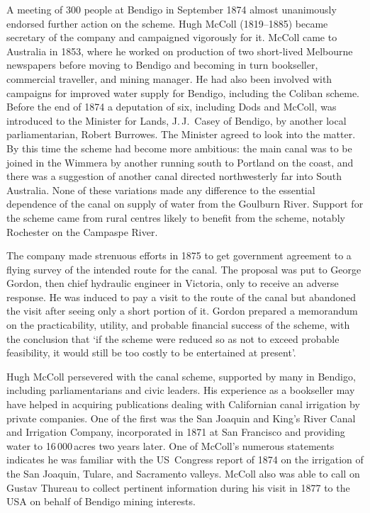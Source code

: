 A meeting of 300 people at Bendigo in September 1874 almost
unanimously endorsed further action on the scheme.  Hugh McColl
(1819--1885) became secretary of the company and campaigned vigorously
for it.  McColl came to Australia in 1853, where he worked on
production of two short-lived Melbourne newspapers before moving to
Bendigo and becoming in turn bookseller, commercial traveller, and
mining manager.  He had also been involved with campaigns for improved
water supply for Bendigo, including the Coliban scheme.  Before the
end of 1874 a deputation of six, including Dods and McColl, was
introduced to the Minister for Lands, J.\,J.~Casey  of Bendigo, by another local parliamentarian, Robert
Burrowes.   The Minister agreed to look into the
matter.  By this time the scheme had become more ambitious: the main
canal was to be joined in the Wimmera by another running south to
Portland on the coast, and there was a suggestion of another canal
directed northwesterly far into South Australia.  None of these
variations made any difference to the essential dependence of the
canal on supply of water from the Goulburn River.  Support for the
scheme came from rural centres likely to benefit from the scheme,
notably Rochester on the Campaspe River.

The company made strenuous efforts in 1875 to get government
ag\-reement to a flying survey of the intended route for the canal.
The proposal was put to George Gordon,  then chief
hydraulic engineer in Victoria, only to receive an adverse response.
He was induced to pay a visit to the route of the canal but abandoned
the visit after seeing only a short portion of it.  Gordon prepared a
memorandum on the practicability, utility, and probable financial
success of the scheme, with the conclusion that `if the scheme were
reduced so as not to exceed probable feasibility, it would still be
too costly to be entertained at present'.

Hugh McColl persevered with the canal scheme, supported by many in
Bendigo, including parliamentarians and civic leaders.  His experience
as a bookseller may have helped in acquiring publications dealing with
Californian  canal irrigation by private companies.
One of the first was the San Joaquin and King's River Canal and
Irrigation Company, incorporated in 1871 at San Francisco and
providing water to 16\,000\,acres two years later.  One of McColl's
numerous statements indicates he was familiar with the US~Congress
report of 1874 on the irrigation of the San Joaquin, Tulare, and
Sacramento valleys.  McColl also was able to call on Gustav Thureau
 to
collect pertinent information during his visit in 1877 to the USA on
behalf of Bendigo mining interests.

